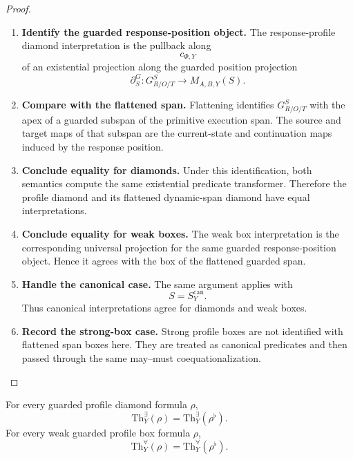 \begin{proof}
\leavevmode
\begin{enumerate}
  \item \textbf{Identify the guarded response-position object.}
  The response-profile diamond interpretation is the pullback along
  \[
    c_{\Phi,Y}
  \]
  of an existential projection along the guarded position projection
  \[
    \partial^G_S:G^S_{R/O/T}\to M_{A,B,Y}(S).
  \]

  \item \textbf{Compare with the flattened span.}
  Flattening identifies \(G^S_{R/O/T}\) with the apex of a guarded subspan of
  the primitive execution span.  The source and target maps of that subspan
  are the current-state and continuation maps induced by the response
  position.

  \item \textbf{Conclude equality for diamonds.}
  Under this identification, both semantics compute the same existential
  predicate transformer.  Therefore the profile diamond and its flattened
  dynamic-span diamond have equal interpretations.

  \item \textbf{Conclude equality for weak boxes.}
  The weak box interpretation is the corresponding universal projection for
  the same guarded response-position object.  Hence it agrees with the box of
  the flattened guarded span.

  \item \textbf{Handle the canonical case.}
  The same argument applies with
  \[
    S=S^{\mathrm{can}}_Y.
  \]
  Thus canonical interpretations agree for diamonds and weak boxes.

  \item \textbf{Record the strong-box case.}
  Strong profile boxes are not identified with flattened span boxes here.
  They are treated as canonical predicates and then passed through the same
  may--must coequationalization.
\end{enumerate}
\end{proof}

\begin{corollary}
\label{cor:profile-coequationalization-flattening}
For every guarded profile diamond formula \(\rho\),
\[
  \mathrm{Th}^{\exists}_Y(\rho)
  =
  \mathrm{Th}^{\exists}_Y(\rho^\flat).
\]
For every weak guarded profile box formula \(\rho\),
\[
  \mathrm{Th}^{\forall}_Y(\rho)
  =
  \mathrm{Th}^{\forall}_Y(\rho^\flat).
\]
\end{corollary}

